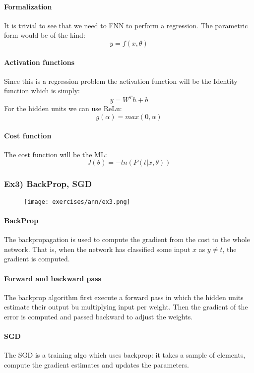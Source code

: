 \paragraph{Formalization}
It is trivial to see that we need to FNN to perform a regression. The parametric form would be of the kind:
$$y=f(x,\theta)$$

\paragraph{Activation functions}
Since this is a regression problem the activation function will be the Identity function which is simply:
$$y=W^Th+b$$
For the hidden units we can use ReLu:
$$g(\alpha)=max(0,\alpha)$$

\paragraph{Cost function }
The cost function will be the ML:
$$J(\theta)=-ln(P(t|x,\theta))$$

\subsubsection{Ex3) BackProp, SGD}

\begin{figure}[H]
    \centering
    \texttt{[image: exercises/ann/ex3.png]}
\end{figure}

\paragraph{BackProp}
The backpropagation is used to compute the gradient from the cost to the whole network. That is, when the network has  classified some input $x$ as $y\neq t$, the gradient is computed.

\paragraph{Forward and backward pass}
The backprop algorithm first execute a forward pass in which the hidden units estimate their output bu multiplying input per weight. Then the gradient of the error is computed and passed backward to adjust the weights.

\paragraph{SGD}
The SGD is a training algo which uses backprop: it takes a sample of elements, compute the gradient estimates and updates the parameters.

